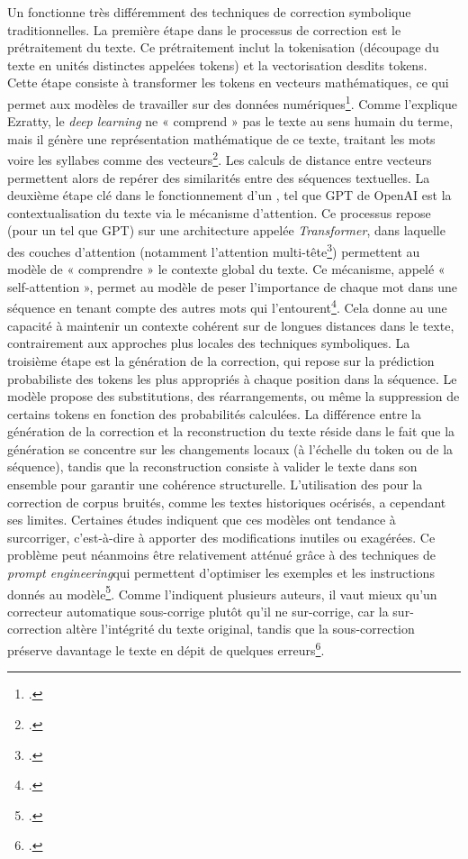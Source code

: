 Un \llm fonctionne très différemment des techniques de correction symbolique traditionnelles. La première étape dans le processus de correction est le prétraitement du texte. Ce prétraitement inclut la tokenisation (découpage du texte en unités distinctes appelées tokens) et la vectorisation desdits tokens. Cette étape consiste à transformer les tokens en vecteurs mathématiques, ce qui permet aux modèles de travailler sur des données numériques\footcite{das_building_2024}. Comme l’explique Ezratty, le \textit{deep learning} ne « comprend » pas le texte au sens humain du terme, mais il génère une représentation mathématique de ce texte, traitant les mots voire les syllabes comme des vecteurs\footcite{ezratty_que_nodate}.  Les calculs de distance entre vecteurs permettent alors de repérer des similarités entre des séquences textuelles.
La deuxième étape clé dans le fonctionnement d’un \llm, tel que GPT de OpenAI est la contextualisation du texte via le mécanisme d'attention. Ce processus repose (pour un \llm tel que GPT) sur une architecture appelée \textit{Transformer}, dans laquelle des couches d'attention (notamment l'attention multi-tête\footcite{noauthor_transformateurs_nodate}) permettent au modèle de « comprendre » le contexte global du texte. Ce mécanisme, appelé « self-attention », permet au modèle de peser l'importance de chaque mot dans une séquence en tenant compte des autres mots qui l’entourent\footcite[p.2]{vaswani_attention_2023}.   Cela donne au \llm une capacité à maintenir un contexte cohérent sur de longues distances dans le texte, contrairement aux approches plus locales des techniques symboliques.
La troisième étape est la génération de la correction, qui repose sur la prédiction probabiliste des tokens les plus appropriés à chaque position dans la séquence. Le modèle propose des substitutions, des réarrangements, ou même la suppression de certains tokens en fonction des probabilités calculées. La différence entre la génération de la correction et la reconstruction du texte réside dans le fait que la génération se concentre sur les changements locaux (à l’échelle du token ou de la séquence), tandis que la reconstruction consiste à valider le texte dans son ensemble pour garantir une cohérence structurelle.
L’utilisation des \llm pour la correction de corpus bruités, comme les textes historiques océrisés, a cependant ses limites. Certaines études indiquent que ces modèles ont tendance à surcorriger, c’est-à-dire à apporter des modifications inutiles ou exagérées. Ce problème peut néanmoins être relativement atténué grâce à des techniques de \textit{prompt engineering}qui permettent d’optimiser les exemples et les instructions donnés au modèle\footcite[p.135]{boros_post-correction_2024}. Comme l’indiquent plusieurs auteurs, il vaut mieux qu'un correcteur automatique sous-corrige plutôt qu'il ne sur-corrige, car la sur-correction altère l'intégrité du texte original, tandis que la sous-correction préserve davantage le texte en dépit de quelques erreurs\footcite[p.2]{baranes_vers_2012}.

